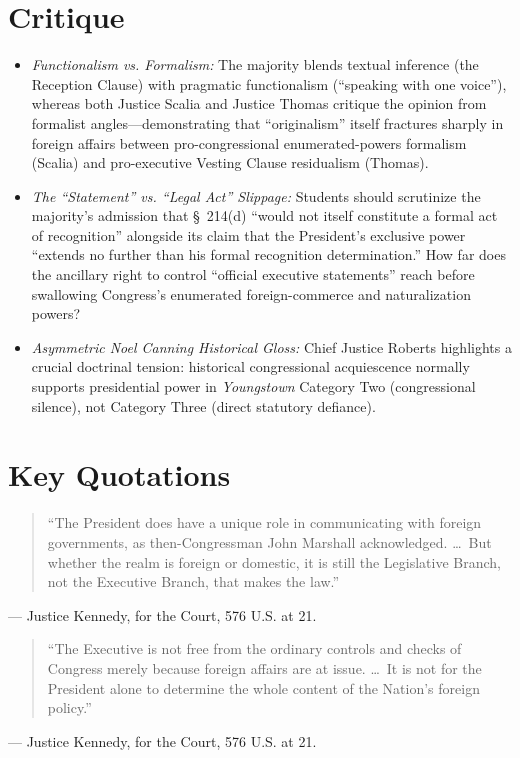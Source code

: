 \documentclass[12pt]{article}
\begin{document}
\section{Critique}
\begin{itemize}
  \item \textit{Functionalism vs. Formalism:} The majority blends textual inference (the Reception Clause) with pragmatic functionalism (``speaking with one voice''), whereas both Justice Scalia and Justice Thomas critique the opinion from formalist angles---demonstrating that ``originalism'' itself fractures sharply in foreign affairs between pro-congressional enumerated-powers formalism (Scalia) and pro-executive Vesting Clause residualism (Thomas).
  \item \textit{The ``Statement'' vs. ``Legal Act'' Slippage:} Students should scrutinize the majority's admission that \S~214(d) ``would not itself constitute a formal act of recognition'' alongside its claim that the President's exclusive power ``extends no further than his formal recognition determination.'' How far does the ancillary right to control ``official executive statements'' reach before swallowing Congress's enumerated foreign-commerce and naturalization powers?
  \item \textit{Asymmetric \textit{Noel Canning} Historical Gloss:} Chief Justice Roberts highlights a crucial doctrinal tension: historical congressional acquiescence normally supports presidential power in \textit{Youngstown} Category Two (congressional silence), not Category Three (direct statutory defiance).
\end{itemize}

\section{Key Quotations}
\begin{quote}
``The President does have a unique role in communicating with foreign governments, as then-Congressman John Marshall acknowledged. \dots\ But whether the realm is foreign or domestic, it is still the Legislative Branch, not the Executive Branch, that makes the law.''
\end{quote}
\noindent --- Justice Kennedy, for the Court, 576 U.S. at 21.

\begin{quote}
``The Executive is not free from the ordinary controls and checks of Congress merely because foreign affairs are at issue. \dots\ It is not for the President alone to determine the whole content of the Nation's foreign policy.''
\end{quote}
\noindent --- Justice Kennedy, for the Court, 576 U.S. at 21.
\end{document}
